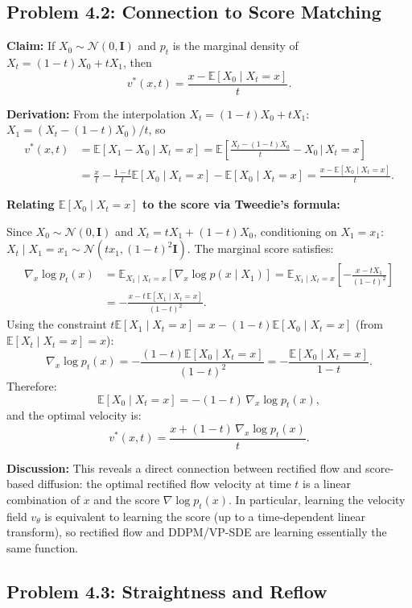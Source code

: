 \documentclass[11pt]{article}
\newcommand{\E}{\mathbb{E}}
\newcommand{\N}{\mathcal{N}}
\begin{document}
\subsection{Problem 4.2: Connection to Score Matching}

\textbf{Claim:} If $X_0\sim\N(0,\mathbf{I})$ and $p_t$ is the marginal density of $X_t=(1-t)X_0+tX_1$, then
\[
v^*(x,t) = \frac{x - \E[X_0\mid X_t=x]}{t}.
\]

\textbf{Derivation:} From the interpolation $X_t=(1-t)X_0+tX_1$:
$X_1 = (X_t-(1-t)X_0)/t$, so
\begin{align*}
v^*(x,t) &= \E[X_1-X_0\mid X_t=x]
           = \E\!\left[\frac{X_t-(1-t)X_0}{t}-X_0\,\bigg|\,X_t=x\right]\\
          &= \frac{x}{t} - \frac{1-t}{t}\E[X_0\mid X_t=x] - \E[X_0\mid X_t=x]
           = \frac{x - \E[X_0\mid X_t=x]}{t}.
\end{align*}

\textbf{Relating $\E[X_0\mid X_t=x]$ to the score via Tweedie's formula:}

Since $X_0\sim\N(0,\mathbf{I})$ and $X_t=tX_1+(1-t)X_0$, conditioning on $X_1=x_1$:
$X_t\mid X_1=x_1\sim\N(tx_1,(1-t)^2\mathbf{I})$.
The marginal score satisfies:
\begin{align*}
\nabla_x\log p_t(x)
&= \E_{X_1\mid X_t=x}\!\left[\nabla_x\log p(x\mid X_1)\right]
 = \E_{X_1\mid X_t=x}\!\left[-\frac{x-tX_1}{(1-t)^2}\right]\\
&= -\frac{x-t\,\E[X_1\mid X_t=x]}{(1-t)^2}.
\end{align*}
Using the constraint $t\E[X_1\mid X_t=x] = x-(1-t)\E[X_0\mid X_t=x]$
(from $\E[X_t\mid X_t=x]=x$):
\[
\nabla_x\log p_t(x)
= -\frac{(1-t)\E[X_0\mid X_t=x]}{(1-t)^2}
= -\frac{\E[X_0\mid X_t=x]}{1-t}.
\]
Therefore:
\[
\E[X_0\mid X_t=x] = -(1-t)\,\nabla_x\log p_t(x),
\]
and the optimal velocity is:
\begin{equation}\boxed{
v^*(x,t) = \frac{x + (1-t)\,\nabla_x\log p_t(x)}{t}.}
\end{equation}

\textbf{Discussion:} This reveals a direct connection between rectified flow and
score-based diffusion: the optimal rectified flow velocity at time $t$ is a linear
combination of $x$ and the score $\nabla\log p_t(x)$.  In particular, learning the
velocity field $v_\theta$ is equivalent to learning the score (up to a time-dependent
linear transform), so rectified flow and DDPM/VP-SDE are learning essentially the same
function.

\subsection{Problem 4.3: Straightness and Reflow}
\end{document}
